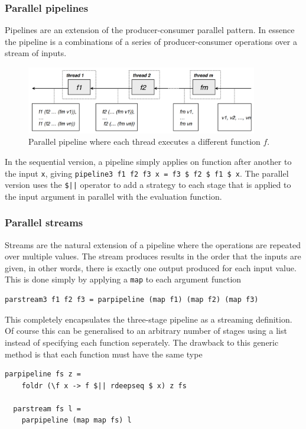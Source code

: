 \documentclass[CS4204-Notes.tex]{subfiles}
\begin{document}
\subsubsection{Parallel pipelines}
Pipelines are an extension of the producer-consumer parallel pattern. In essence the pipeline is a combinations of a series of producer-consumer operations over a stream of inputs.
\begin{figure}[H]
  \centering
  \includegraphics[width=0.9\textwidth, keepaspectratio]{imgs/parallel-pipeline.png}
  \caption{Parallel pipeline where each thread executes a different function $f$.}
\end{figure}
\noindent
In the sequential version, a pipeline simply applies on function after another to the input \texttt{x}, giving \texttt{pipeline3 f1 f2 f3 x = f3 \$  f2 \$ f1 \$ x}. The parallel version uses the \texttt{\$||} operator to add a strategy to each stage that is applied to the input argument in parallel with the evaluation function.

\subsubsection{Parallel streams}
Streams are the natural extension of a pipeline where the operations are repeated over multiple values. The stream produces results in the order that the inputs are given, in other words, there is exactly one output produced for each input value. This is done simply by applying a \texttt{map} to each argument function
\begin{lstlisting}[caption={Parallel stream pattern on a three-stage pipeline.}]
parstream3 f1 f2 f3 = parpipeline (map f1) (map f2) (map f3)
\end{lstlisting}
This completely encapsulates the three-stage pipeline as a streaming definition. Of course this can be generalised to an arbitrary number of stages using a list instead of specifying each function seperately. The drawback to this generic method is that each function must have the same type
\begin{lstlisting}[caption={Arbitrarily sized \texttt{parstream} using a list of functions \texttt{fs}.}]
  parpipeline fs z =
    foldr (\f x -> f $|| rdeepseq $ x) z fs

  parstream fs l =
    parpipeline (map map fs) l
\end{lstlisting}
\end{document}
